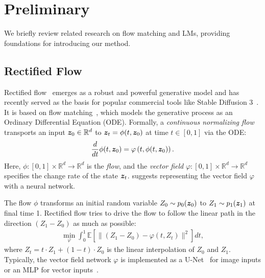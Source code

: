 
\section{Preliminary}
We briefly review related research on flow matching and LMs, providing foundations for introducing our method.

\subsection{Rectified Flow}\label{sec:rw_rf}

Rectified flow~\cite{liu2022flow,albergo2023building} emerges as a robust and powerful generative model and has recently served as the basis for popular commercial tools like Stable Diffusion 3~\cite{stabilityAI2023}. It is based on flow matching~\cite{chen2018neural,lipman2022flow}, which models the generative process as an Ordinary Differential Equation (ODE).  Formally, a \emph{continuous normalizing flow} transports an input ${\bm{z}}_0\in \mathbb{R}^d$ to ${\bm{z}}_t=\phi(t, {\bm{z}}_0)$ at time $t\in[0,1]$ via the ODE:
\begin{align}
    \frac{d}{dt}\phi(t, {\bm{z}}_0) = \varphi\left(t, \phi(t, {\bm{z}}_0)\right).
\end{align}
Here, $\phi:[0,1]\times \mathbb{R}^d\rightarrow\mathbb{R}^d$ is the \emph{flow}, and the \emph{vector field} $\varphi: [0,1]\times \mathbb{R}^d\rightarrow \mathbb{R}^d$ specifies the change rate of the state ${\bm{z}}_t$. \citet{chen2018neural} suggests representing the vector field $\varphi$ with a neural network.

The flow $\phi$ transforms an initial random variable $Z_0\sim p_0({\bm{z}}_0)$ to $Z_1\sim p_1({\bm{z}}_1)$ at final time 1. Rectified flow tries to drive the flow to follow the linear path in the direction $(Z_1-Z_0)$ as much as possible:
\begin{align}
    \min_\varphi \int_0^1 \mathbb{E}\left[\|(Z_1-Z_0)-\varphi(t, Z_t)\|^2\right]dt,\label{equ:rf}
\end{align}
where $Z_t=t\cdot Z_1 + (1-t)\cdot Z_0$ is the linear interpolation of $Z_0$ and $Z_1$. Typically, the vector field network $\varphi$ is implemented as a U-Net~\citep{ronneberger2015unet} for image inputs or an MLP for vector inputs~\cite{wang2024diffusion}.

